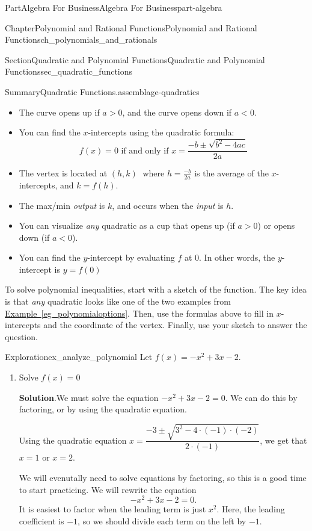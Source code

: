 \documentclass[oneside,10pt,]{tufte-book}
\newcommand{\blocktitlefont}{\relax}
\newcommand{\xreffont}{\relax}
\numberwithin{equation}{chapter}
\newcommand{\lt}{<}
\newcommand{\gt}{>}
\begin{document}
\begin{partptx}{Part}{Algebra For Business}{}{Algebra For Business}{}{}{part-algebra}
\begin{chapterptx}{Chapter}{Polynomial and Rational Functions}{}{Polynomial and Rational Functions}{}{}{ch_polynomials_and_rationals}
\begin{sectionptx}{Section}{Quadratic and Polynomial Functions}{}{Quadratic and Polynomial Functions}{}{}{sec_quadratic_functions}
\begin{assemblage}{Summary}{Quadratic Functions.}{assemblage-quadratics}
\begin{itemize}[label=\textbullet]
\item{}The curve opens up if \(a>0\), and the curve opens down if \(a<0\).%
\item{}You can find the \(x\)-intercepts using the quadratic formula:%
\begin{equation*}
f(x) = 0\text{ if and only if }x = \dfrac{-b\pm \sqrt{b^2-4ac}}{2a}
\end{equation*}
%
\item{}The vertex is located at \((h,k)\)\(\phantom{.}\) where \(h=\frac{-b}{2a}\) is the average of the \(x\)-intercepts, and \(k = f(h)\).%
\item{}The max\slash{}min \emph{output} is \(k\), and occurs when the \emph{input} is \(h\).%
\item{}You can visualize \emph{any} quadratic as a cup that opens up (if \(a \gt 0\)) or opens down (if \(a \lt 0\)).%
\item{}You can find the \(y\)-intercept by evaluating \(f\) at \(0\).  In other words, the \(y\)-intercept is \(y=f(0)\)%
\end{itemize}
%
\end{assemblage}
To solve polynomial inequalities, start with a sketch of the function. The key idea is that \emph{any} quadratic looks like one of the two examples from \hyperref[eg_polynomialoptions]{Example~{\xreffont\ref{eg_polynomialoptions}}}.  Then, use the formulas above to fill in \(x\)-intercepts and the coordinate of the vertex.  Finally, use your sketch to answer the question.%
\begin{exploration}{Exploration}{}{ex_analyze_polynomial}%
Let \(f(x)=-x^2 + 3x -2 \).%
\begin{enumerate}[font=\bfseries,label=(\alph*),ref=\alph*]%
\item{}Solve \(f(x) =0\)%
\par\smallskip%
\noindent\textbf{\blocktitlefont Solution}.\hypertarget{ex_analyze_polynomial-2-2}{}\quad{}We must solve the equation \(-x^2 + 3x -2 = 0\). We can do this by factoring, or by using the quadratic equation.%
\par
Using the quadratic equation \(x = \dfrac{-3 \pm \sqrt{3^2 - 4\cdot (-1) \cdot (-2)}}{2\cdot(-1)}\), we get that \(x=1\) or \(x=2\).%
\par
We will evenutally need to solve equations by factoring, so this is a good time to start practicing.  We will rewrite the equation%
\begin{equation*}
-x^2 + 3x -2 = 0 \text{.}
\end{equation*}
It is easiest to factor when the leading term is just  \(x^2\).  Here, the leading coefficient is \(-1\), so we should divide each term on the left by \(-1\).%

\end{enumerate}
\end{exploration}
\end{sectionptx}
\end{chapterptx}
\end{partptx}
\end{document}

